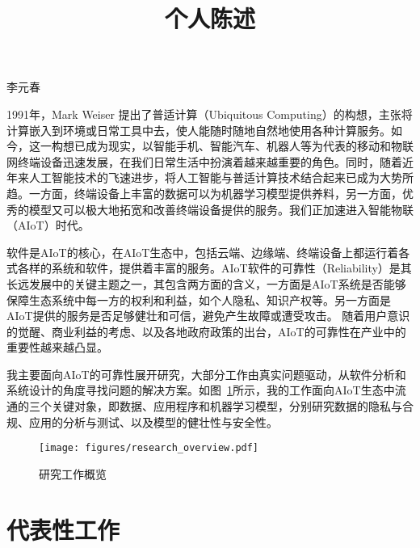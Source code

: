 \documentclass[12pt]{article}
\begin{document}

\title{个人陈述}

\maketitle


\begin{center} {李元春} \end{center}



1991年，Mark Weiser 提出了普适计算（Ubiquitous Computing）的构想，主张将计算嵌入到环境或日常工具中去，使人能随时随地自然地使用各种计算服务。如今，这一构想已成为现实，以智能手机、智能汽车、机器人等为代表的移动和物联网终端设备迅速发展，在我们日常生活中扮演着越来越重要的角色。同时，随着近年来人工智能技术的飞速进步，将人工智能与普适计算技术结合起来已成为大势所趋。一方面，终端设备上丰富的数据可以为机器学习模型提供养料，另一方面，优秀的模型又可以极大地拓宽和改善终端设备提供的服务。我们正加速进入智能物联（AIoT）时代。

软件是AIoT的核心，在AIoT生态中，包括云端、边缘端、终端设备上都运行着各式各样的系统和软件，提供着丰富的服务。AIoT软件的可靠性（Reliability）是其长远发展中的关键主题之一，其包含两方面的含义，一方面是AIoT系统是否能够保障生态系统中每一方的权利和利益，如个人隐私、知识产权等。另一方面是AIoT提供的服务是否足够健壮和可信，避免产生故障或遭受攻击。
随着用户意识的觉醒、商业利益的考虑、以及各地政府政策的出台，AIoT的可靠性在产业中的重要性越来越凸显。

我主要面向AIoT的可靠性展开研究，大部分工作由真实问题驱动，从软件分析和系统设计的角度寻找问题的解决方案。如图~\ref{fig:overview}所示，我的工作面向AIoT生态中流通的三个关键对象，即数据、应用程序和机器学习模型，分别研究数据的隐私与合规、应用的分析与测试、以及模型的健壮性与安全性。


\begin{figure}
    \centering
    \texttt{[image: figures/research\_overview.pdf]}
    \caption{研究工作概览}
    \label{fig:overview}
\end{figure}

\section{代表性工作}
\end{document}
